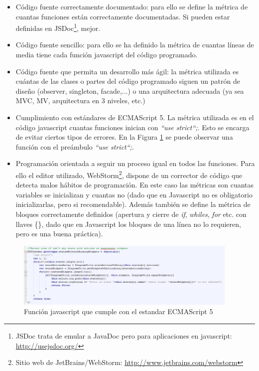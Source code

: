 \begin{itemize}
\item{Código fuente correctamente documentado: para ello se define la métrica de cuantas funciones están correctamente documentadas. Si pueden estar definidas en JSDoc\footnote{JSDoc trata de emular a JavaDoc pero para aplicaciones en javascript: \url{http://usejsdoc.org/}}, mejor.}
\item{Código fuente sencillo: para ello se ha definido la métrica de cuantas líneas de media tiene cada función javascript del código programado.}
\item{Código fuente que permita un desarrollo más ágil: la métrica utilizada es cuántas de las clases o partes del código programado siguen un patrón de diseño (observer, singleton, facade,...) o una arquitectura adecuada (ya sea MVC, MV, arquitectura en 3 niveles, etc.)}
\item{Cumplimiento con estándares de ECMAScript 5. La métrica utilizada es en el código javascript cuantas funciones inician con \emph{``use strict``;}. Esto se encarga de evitar ciertos tipos de errores. En la Figura \ref{fig:UseStrict}} se puede observar una función con el preámbulo \emph{``use strict``;}.
\item{Programación orientada a seguir un proceso igual en todos las funciones. Para ello el editor utilizado, WebStorm\footnote{Sitio web de JetBrains/WebStorm: \url{http://www.jetbrains.com/webstorm}}, dispone de un corrector de código que detecta malos hábitos de programación. En este caso las métricas son cuantas variables se inicializan y cuantas no (dado que en Javascript no es obligatorio inicializarlas, pero si recomendable). Además también se define la métrica de bloques correctamente definidos (apertura y cierre de \emph{if}, \emph{whiles}, \emph{for} etc. con llaves \{\}, dado que en Javascript los bloques de una línea no lo requieren, pero es una buena práctica).}
\end{itemize}

\begin{figure}
\begin{center}
\includegraphics[width=0.95\textwidth]{figs/6-UseStrict.png}
\end{center}
\caption{Función javascript que cumple con el estandar ECMAScript 5}
\label{fig:UseStrict}
\end{figure}

